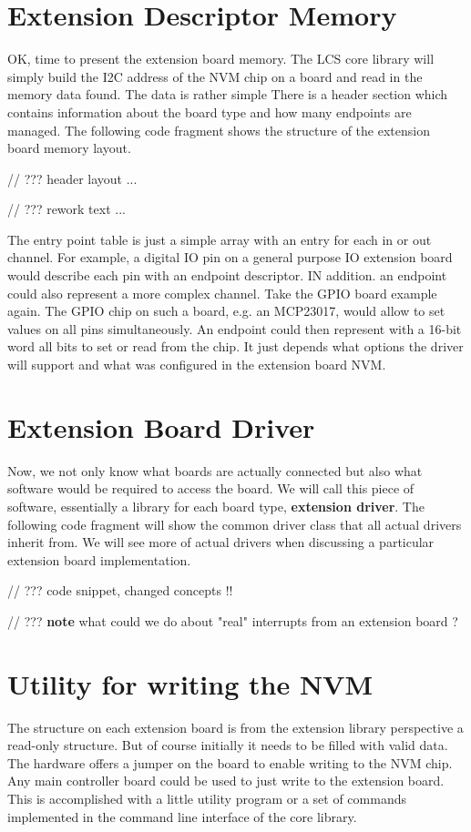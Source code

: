 \section{Extension Descriptor Memory}

OK, time to present the extension board memory. The LCS core library will simply build the I2C address of the NVM chip on a board and read in the memory data found. The data is rather simple There is a header section which contains information about the board type and how many endpoints are managed. The following code fragment shows the structure of the extension board memory layout.

// ??? header layout ...

// ??? rework text ...

The entry point table is just a simple array with an entry for each in or out channel. For example, a digital IO pin on a general purpose IO extension board would describe each pin with an endpoint descriptor. IN addition. an endpoint could also represent a more complex channel. Take the GPIO board example again. The GPIO chip on such a board, e.g. an MCP23017, would allow to set values on all pins simultaneously. An endpoint could then represent with a 16-bit word all bits to set or read from the chip. It just depends what options the driver will support and what was configured in the extension board NVM.

\section{Extension Board Driver}

Now, we not only know what boards are actually connected but also what software would be required to access the board. We will call this piece of software, essentially a library for each board type, \textbf{extension driver}. The following code fragment will show the common driver class that all actual drivers inherit from. We will see more of actual drivers when discussing a particular extension board implementation.

// ??? code snippet, changed concepts !!

// ??? \textbf{note} what could we do about "real" interrupts from an extension board ?

\section{Utility for writing the NVM}

The structure on each extension board is from the extension library perspective a read-only structure. But of course initially it needs to be filled with valid data. The hardware offers a jumper on the board to enable writing to the NVM chip. Any main controller board could be used to just write to the extension board. This is accomplished with a little utility program or a set of commands implemented in the command line interface of the core library.

